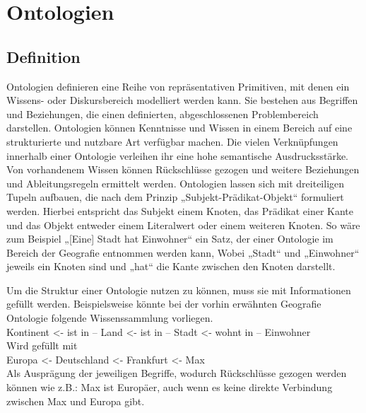 \chapter{Ontologien}
\section{Definition}
Ontologien definieren eine Reihe von repräsentativen Primitiven, mit denen ein Wissens- oder Diskursbereich modelliert werden kann. Sie bestehen aus Begriffen und Beziehungen, die einen definierten, abgeschlossenen Problembereich darstellen. \cite{TomGruber.2009}\newline
Ontologien können Kenntnisse und Wissen in einem Bereich auf eine strukturierte und nutzbare Art verfügbar machen. Die vielen Verknüpfungen innerhalb einer Ontologie verleihen ihr eine hohe semantische Ausdrucksstärke. Von vorhandenem Wissen können Rückschlüsse gezogen und weitere Beziehungen und Ableitungsregeln ermittelt werden. \cite{WolfgangHesse.2005}\newline
Ontologien lassen sich mit dreiteiligen Tupeln aufbauen, die nach dem Prinzip „Subjekt-Prädikat-Objekt“ formuliert werden. Hierbei entspricht das Subjekt einem Knoten, das Prädikat einer Kante und das Objekt entweder einem Literalwert oder einem weiteren Knoten. So wäre zum Beispiel „[Eine] Stadt hat Einwohner“ ein Satz, der einer Ontologie im Bereich der Geografie entnommen werden kann, Wobei „Stadt“ und „Einwohner“ jeweils ein Knoten sind und „hat“ die Kante zwischen den Knoten darstellt. \cite{Wikipedia.31.10.201911:12}\newline

Um die Struktur einer Ontologie nutzen zu können, muss sie mit Informationen gefüllt werden. Beispielsweise könnte bei der vorhin erwähnten Geografie Ontologie folgende Wissenssammlung vorliegen.\\


Kontinent <- ist in – Land <- ist in – Stadt <- wohnt in – Einwohner \\

Wird gefüllt mit \\

Europa <- Deutschland <- Frankfurt <- Max \\

Als Ausprägung der jeweiligen Begriffe, wodurch Rückschlüsse gezogen werden können wie z.B.: Max ist Europäer, auch wenn es keine direkte Verbindung zwischen Max und Europa gibt.
